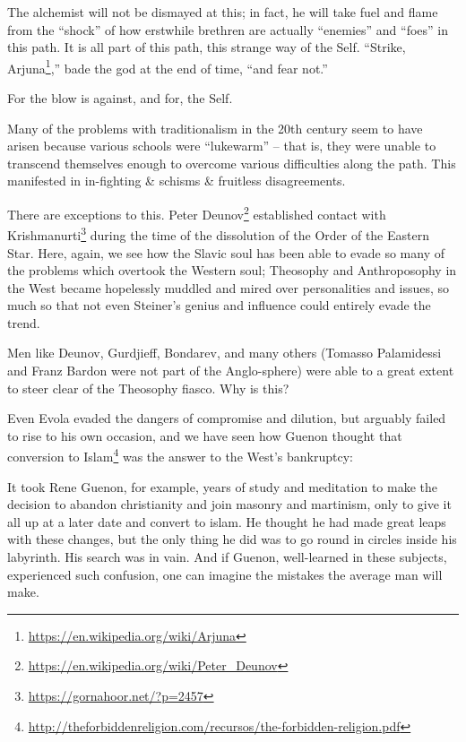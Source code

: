The alchemist will not be dismayed at this; in fact, he will take fuel and flame from the ``shock'' of how erstwhile brethren are actually ``enemies'' and ``foes'' in this path. It is all part of this path, this strange way of the Self. ``Strike, Arjuna\footnote{\url{https://en.wikipedia.org/wiki/Arjuna}},'' bade the god at the end of time, ``and fear not.''

For the blow is against, and for, the Self.

Many of the problems with traditionalism in the 20th century seem to have arisen because various schools were ``lukewarm'' -- that is, they were unable to transcend themselves enough to overcome various difficulties along the path. This manifested in in-fighting \& schisms
\& fruitless disagreements.


There are exceptions to this. Peter Deunov\footnote{\url{https://en.wikipedia.org/wiki/Peter\_Deunov}} established contact with Krishmanurti\footnote{\url{https://gornahoor.net/?p=2457}} during the time of the dissolution of the Order of the Eastern Star. Here, again, we see how the Slavic soul has been able to evade so many of the problems which overtook the Western soul; Theosophy and Anthroposophy in the West became hopelessly muddled and mired over personalities and issues, so much so that not even Steiner's genius and influence could entirely evade the trend.

Men like Deunov, Gurdjieff, Bondarev, and many others (Tomasso Palamidessi and Franz Bardon were not part of the Anglo-sphere) were able to a great extent to steer clear of the Theosophy fiasco. Why is this?

Even Evola evaded the dangers of compromise and dilution, but arguably failed to rise to his own occasion, and we have seen how Guenon thought that conversion to Islam\footnote{\url{http://theforbiddenreligion.com/recursos/the-forbidden-religion.pdf}} was the answer to the West's bankruptcy:

\begin{quotex}
It took Rene Guenon, for example, years of study and meditation to make the decision to abandon christianity and join masonry and martinism, only to give it all up at a later date and convert to islam. He thought he had made great leaps with these changes, but the only thing he did was to go round in circles inside his labyrinth. His search was in vain. And if Guenon, well-learned in these subjects, experienced such confusion, one can imagine the mistakes the average man will make.
\end{quotex}


